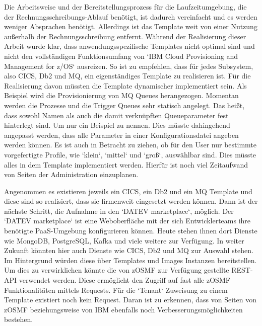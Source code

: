 Die Arbeitsweise und der Bereitstellungsprozess für die Laufzeitumgebung, die der Rechnungsschreibungs-Ablauf benötigt, ist dadurch vereinfacht und es werden weniger Absprachen benötigt.
Allerdings ist das Template weit von einer Nutzung außerhalb der Rechnungsschreibung entfernt.
Während der Realisierung dieser Arbeit wurde klar, dass anwendungsspezifische Templates nicht optimal sind und nicht den vollständigen Funktionsumfang von `IBM Cloud Provisioning and Management for z/OS` ausreizen.
So ist zu empfehlen, dass für jedes Subsystem, also CICS, Db2 und MQ, ein eigenständiges Template zu realisieren ist.
Für die Realisierung davon müssten die Template dynamischer implementiert sein.
Als Beispiel wird die Provisionierung von MQ Queues herangezogen.
Momentan werden die Prozesse und die Trigger Queues sehr statisch angelegt.
Das heißt, dass sowohl Namen als auch die damit verknüpften Queueparameter fest hinterlegt sind.
Um nur ein Beispiel zu nennen.
Dies müsste dahingehend angepasst werden, dass alle Parameter in einer Konfigurationsdatei angeben werden können.
Es ist auch in Betracht zu ziehen, ob für den User nur bestimmte vorgefertigte Profile, wie `klein`, `mittel` und `groß`, auswählbar sind.
Dies müsste alles in dem Template implementiert werden.
Hierfür ist noch viel Zeitaufwand von Seiten der Administration einzuplanen.

Angenommen es existieren jeweils ein CICS, ein Db2 und ein MQ Template und diese sind so realisiert, dass sie firmenweit eingesetzt werden können.
Dann ist der nächste Schritt, die Aufnahme in den `DATEV marketplace`, möglich.
Der `DATEV marketplace` ist eine Weboberfläche mit der sich Entwicklerteams ihre benötigte PaaS-Umgebung konfigurieren können.
Heute stehen ihnen dort Dienste wie MongoDB, PostgreSQL, Kafka und viele weitere zur Verfügung.
In weiter Zukunft könnten hier auch Dienste wie CICS, Db2 und MQ zur Auswahl stehen.
Im Hintergrund würden diese über Templates und Images Instanzen bereitstellen.
Um dies zu verwirklichen könnte die von zOSMF zur Verfügung gestellte REST-API verwendet werden.
Diese ermöglicht den Zugriff auf fast alle zOSMF Funktionalitäten mittels Requests.
Für die `Tenant` Zuweisung zu einem Template existiert noch kein Request.
Daran ist zu erkennen, dass von Seiten von zOSMF beziehungsweise von IBM ebenfalls noch Verbesserungsmöglichkeiten bestehen.
 
